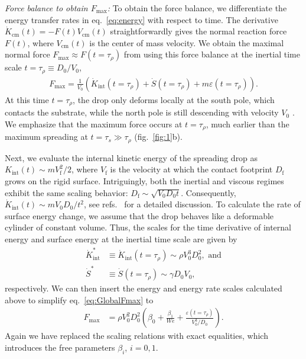\documentclass[preprint,amssymb,superscriptaddress,aps,prl,floatfix]{revtex4-1}
\begin{document}
{\it Force balance to obtain $F_\text{max}$:}
To obtain the force balance, we differentiate  the energy transfer rates in eq.~\eqref{eq:energy} with respect to time. The derivative 
$\dot{K}_{\text{cm}}(t) = -F(t)V_{\text{cm}}(t)$ straightforwardly gives
the normal reaction force  $F(t)$, where  $V_{\text{cm}}(t)$ is the center of mass velocity.  We obtain the 
maximal normal  force $F_{\text{max}} \approx F (t= \tau_\rho )$
from using this  force balance at 
the inertial time scale $t = \tau_\rho \equiv D_0/V_0$,
\begin{align}
	\label{eq:GlobalFmax}
	F_{\text{max}} = \frac{1}{V_0}\left(\dot{K}_{\text{int}}(t = \tau_\rho) + \dot{S}(t = \tau_\rho) + m\varepsilon(t = \tau_\rho)\right). 
\end{align}
At this time $t= \tau_\rho$, the drop only deforms locally at the south pole, which contacts the substrate, while the north pole is still descending with velocity $V_0$ \cite{Eggers2010, sanjayzhang2022prl}. 
We emphasize that the maximum force occurs 
at $t = \tau_\rho$, much earlier than  
the maximum spreading at $t = \tau_s \gg \tau_\rho$ (fig.~\ref{fig:1}b). 

 Next, we  evaluate the internal kinetic energy of the spreading drop as $K_{\text{int}}(t) \sim mV_{\text{f}}^2/2$, where $V_{\text{f}}$ is the velocity at which the contact footprint $D_{\text{f}}$ grows on the rigid surface. Intriguingly, both the inertial \cite{wagner1932stoss, mandre2009precursors} and viscous \cite{hertz1881contact, langley2017impact, bilotto2023fluid, bertin2024similarity} regimes exhibit the same scaling behavior: $D_{\text{f}} \sim \sqrt{V_0D_0t}$. Consequently, $\dot{K}_{\text{int}}(t) \sim mV_0D_0/t^2$, see refs.\ 
 \cite{Philippi2016, supplMaterial} for a detailed discussion. To calculate the rate of surface energy change, we assume that  the drop behaves like a deformable cylinder of constant volume. Thus, the scales for the 
 time derivative 
 of internal energy and surface energy at the inertial time scale are given by
\begin{align}
	\dot{K}_{\text{int}}^* &\equiv \dot{K}_{\text{int}}(t = \tau_\rho) \sim \rho V_0^3D_0^2,\,\,\text{and}\\
	\dot{S}^* &\equiv \dot{S}(t = \tau_\rho) \sim \gamma D_0V_0,
\end{align}
respectively. We can then insert the energy and energy rate scales calculated above to simplify 
eq.\ \eqref{eq:GlobalFmax} to 
\begin{align}
	\label{eq:GlobalFmax_v2}
	F_{\text{max}} &= \rho V_0^2D_0^2\left(\beta_0 + \frac{\beta_1}{We} + \frac{\varepsilon(t = \tau_\rho)}{V_0^3/D_0}\right). 
\end{align}
Again we have replaced the scaling relations with exact equalities, which  introduces the free parameters  
$\beta_i$, $i=0,1$. 
\end{document}
